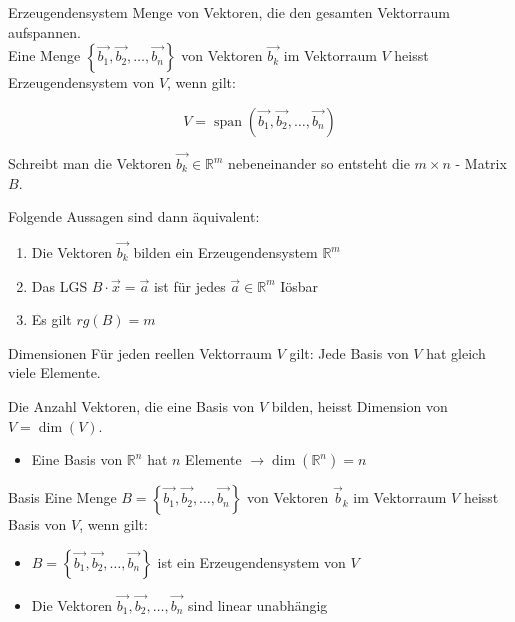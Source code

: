 \begin{concept}{Erzeugendensystem}
    Menge von Vektoren, die den gesamten Vektorraum aufspannen.\\
    Eine Menge $\left\{\overrightarrow{b_{1}}, \overrightarrow{b_{2}}, \ldots, \overrightarrow{b_{n}}\right\}$ von Vektoren $\overrightarrow{b_{k}}$ im Vektorraum $V$ heisst Erzeugendensystem von $V$, wenn gilt:

    $$
    V=\operatorname{span}\left(\overrightarrow{b_{1}}, \overrightarrow{b_{2}}, \ldots, \overrightarrow{b_{n}}\right)
    $$

    Schreibt man die Vektoren $\overrightarrow{b_{k}} \in \mathbb{R}^{m}$ nebeneinander so entsteht die $m \times n$ - Matrix $B$.

    Folgende Aussagen sind dann äquivalent:

    \begin{enumerate}
    \item Die Vektoren $\overrightarrow{b_{k}}$ bilden ein Erzeugendensystem $\mathbb{R}^{m}$

    \item Das LGS $B \cdot \vec{x}=\vec{a}$ ist für jedes $\vec{a} \in \mathbb{R}^{m}$ Iösbar

    \item Es gilt $r g(B)=m$

    \end{enumerate}
    
\end{concept}

\begin{definition}{Dimensionen}
    Für jeden reellen Vektorraum $V$ gilt: Jede Basis von $V$ hat gleich viele Elemente.

    Die Anzahl Vektoren, die eine Basis von $V$ bilden, heisst Dimension von $V=\operatorname{dim}(V)$.

    \begin{itemize}
    \item Eine Basis von $\mathbb{R}^{n}$ hat $n$ Elemente $\rightarrow \operatorname{dim}\left(\mathbb{R}^{n}\right)=n$
    \end{itemize}
\end{definition}

\begin{definition}{Basis}
    Eine Menge $B=\left\{\overrightarrow{b_{1}}, \overrightarrow{b_{2}}, \ldots, \overrightarrow{b_{n}}\right\}$ von Vektoren $\vec{b}_{k}$ im Vektorraum $V$ heisst Basis von $V$,
    wenn gilt:
    \begin{itemize}
        \item $B=\left\{\overrightarrow{b_{1}}, \overrightarrow{b_{2}}, \ldots, \overrightarrow{b_{n}}\right\}$ ist ein Erzeugendensystem von $V$
        \item Die Vektoren $\overrightarrow{b_{1}}, \overrightarrow{b_{2}}, \ldots, \overrightarrow{b_{n}}$ sind linear unabhängig
    \end{itemize}
\end{definition}

